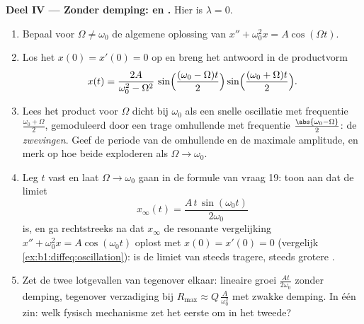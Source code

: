 \begin{problem}
\medskip
\noindent\textbf{Deel IV --- Zonder demping:  en .}
Hier is $\lambda = 0$.
\begin{enumerate}[resume]
  \item Bepaal voor $\Omega \neq \omega_0$ de algemene oplossing van
        $x'' + \omega_0^2 x = A\cos(\Omega t)$.
  \item Los het  $x(0) = x'(0) = 0$ op en breng het
        antwoord in de productvorm
        \[
        x(t) = \frac{2A}{\omega_0^2 - \Omega^2}\,
        \sin\Bigl(\frac{(\omega_0 - \Omega)t}2\Bigr)
        \sin\Bigl(\frac{(\omega_0 + \Omega)t}2\Bigr) .
        \]
  \item Lees het product voor $\Omega$ dicht bij $\omega_0$ als een
        snelle oscillatie met frequentie $\frac{\omega_0 + \Omega}2$,
        gemoduleerd door een trage omhullende met frequentie
        $\frac{\abs{\omega_0 - \Omega}}2$: de
        \emph{zwevingen}. Geef de periode van de
        omhullende en de maximale amplitude, en merk op hoe beide
        exploderen als $\Omega \to \omega_0$.
  \item Leg $t$ vast en laat $\Omega \to \omega_0$ gaan in de formule
        van vraag 19: toon aan dat de limiet
        \[
        x_\infty(t) = \frac{A\,t\,\sin(\omega_0 t)}{2\omega_0}
        \]
        is, en ga rechtstreeks na dat $x_\infty$ de resonante
        vergelijking $x'' + \omega_0^2 x = A\cos(\omega_0 t)$ oplost met
        $x(0) = x'(0) = 0$ (vergelijk
        \cref{ex:b1:diffeq:oscillation}):  is de limiet van
        steeds tragere, steeds grotere .
  \item Zet de twee lotgevallen van  tegenover elkaar:
        lineaire groei $\frac{At}{2\omega_0}$ zonder demping,
        tegenover verzadiging bij $R_{\max} \approx Q\,\frac{A}{\omega_0^2}$
        met zwakke demping. In één zin: welk fysisch mechanisme zet het
        eerste om in het tweede?
\end{enumerate}


\end{problem}
